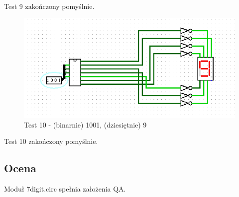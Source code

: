 Test 9 zakończony pomyślnie.

\begin{figure}[H]
    \includegraphics[width=\linewidth]{ScreenshotsTests/Comp 1/Comp 1_00000.png}
    \caption{Test 10 - (binarnie) 1001, (dziesiętnie) 9}
    \label{fig:test9}
\end{figure}

Test 10 zakończony pomyślnie.

\subsection{Ocena}\label{subsec:qa-review}
Moduł 7digit.circ spełnia założenia QA.